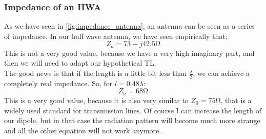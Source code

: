 \subsubsection*{Impedance of an HWA}
As we have seen in \cref{fig:impedance_antenna}, an antenna can be seen as a series of impedance. In our half wave antenna, we have seen empirically that:
\begin{equation}
    Z_a=73+j42.5 \si{\ohm}
\end{equation}
This is not a very good value, because we have a very high imaginary part, and then we will need to adapt our hypothetical TL.\\
The good news is that if the length is a little bit less than $\frac{\lambda}{2}$, we can achieve a completely real impedance. So, for $l=0.48\lambda$:
\begin{equation}
    Z_a=68\si{\ohm}
\end{equation}
This is a very good value, because it is also very similar to $Z_0=75\si{\ohm}$, that is a widely used standard for transmission lines.
Of course I can increase the length of our dipole, but in that case the radiation pattern will become much more strange and all the other equation will not work anymore.
